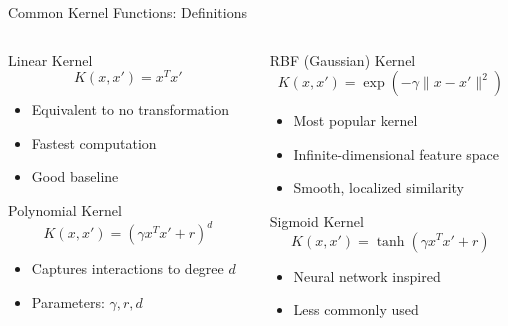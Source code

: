 \documentclass[8pt,aspectratio=1610]{beamer}
\begin{document}
\begin{frame}{Common Kernel Functions: Definitions}
\begin{columns}[t]
\begin{column}{0.48\textwidth}
\begin{block}{Linear Kernel}
$$K(x, x') = x^T x'$$
\begin{itemize}
\setlength{\itemsep}{0pt}
\item Equivalent to no transformation
\item Fastest computation
\item Good baseline
\end{itemize}
\end{block}

\begin{block}{Polynomial Kernel}
$$K(x, x') = (\gamma x^T x' + r)^d$$
\begin{itemize}
\setlength{\itemsep}{0pt}
\item Captures interactions to degree $d$
\item Parameters: $\gamma, r, d$
\end{itemize}
\end{block}
\end{column}

\begin{column}{0.48\textwidth}
\begin{block}{RBF (Gaussian) Kernel}
$$K(x, x') = \exp\left(-\gamma \|x - x'\|^2\right)$$
\begin{itemize}
\setlength{\itemsep}{0pt}
\item Most popular kernel
\item Infinite-dimensional feature space
\item Smooth, localized similarity
\end{itemize}
\end{block}

\begin{block}{Sigmoid Kernel}
$$K(x, x') = \tanh(\gamma x^T x' + r)$$
\begin{itemize}
\setlength{\itemsep}{0pt}
\item Neural network inspired
\item Less commonly used
\end{itemize}
\end{block}
\end{column}
\end{columns}
\end{frame}
\end{document}
